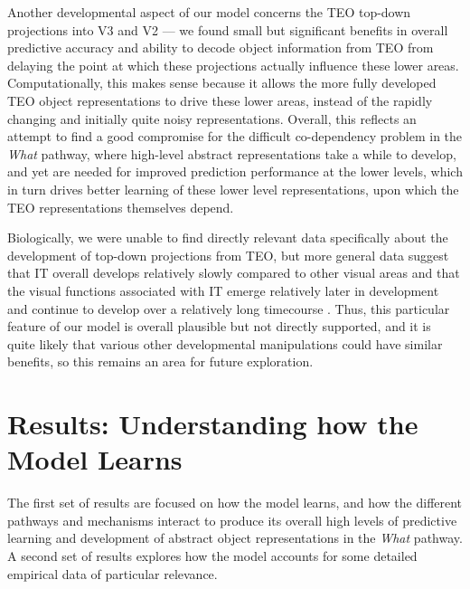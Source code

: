\documentclass[11pt,twoside]{article}
\newif\myifpdf
\begin{document}
Another developmental aspect of our model concerns the TEO top-down projections into V3 and V2 --- we found small but significant benefits in overall predictive accuracy and ability to decode object information from TEO from delaying the point at which these projections actually influence these lower areas.  Computationally, this makes sense because it allows the more fully developed TEO object representations to drive these lower areas, instead of the rapidly changing and initially quite noisy representations.  Overall, this reflects an attempt to find a good compromise for the difficult co-dependency problem in the {\em What} pathway, where high-level abstract representations take a while to develop, and yet are needed for improved prediction performance at the lower levels, which in turn drives better learning of these lower level representations, upon which the TEO representations themselves depend.

Biologically, we were unable to find directly relevant data specifically about the development of top-down projections from TEO, but more general data suggest that IT overall develops relatively slowly compared to other visual areas \cite{Rodman94} and that the visual functions associated with IT emerge relatively later in development and continue to develop over a relatively long timecourse \cite{NishimuraScherfBehrmann09}.  Thus, this particular feature of our model is overall plausible but not directly supported, and it is quite likely that various other developmental manipulations could have similar benefits, so this remains an area for future exploration.

\section{Results: Understanding how the Model Learns}

The first set of results are focused on how the model learns, and how the different pathways and mechanisms interact to produce its overall high levels of predictive learning and development of abstract object representations in the {\em What} pathway.  A second set of results explores how the model accounts for some detailed empirical data of particular relevance.

\end{document}

